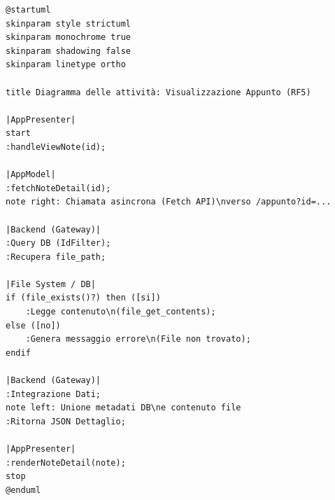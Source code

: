 \begin{verbatim}
@startuml
skinparam style strictuml
skinparam monochrome true
skinparam shadowing false
skinparam linetype ortho

title Diagramma delle attività: Visualizzazione Appunto (RF5)

|AppPresenter|
start
:handleViewNote(id);

|AppModel|
:fetchNoteDetail(id);
note right: Chiamata asincrona (Fetch API)\nverso /appunto?id=...

|Backend (Gateway)|
:Query DB (IdFilter);
:Recupera file_path;

|File System / DB|
if (file_exists()?) then ([si])
    :Legge contenuto\n(file_get_contents);
else ([no])
    :Genera messaggio errore\n(File non trovato);
endif

|Backend (Gateway)|
:Integrazione Dati;
note left: Unione metadati DB\ne contenuto file
:Ritorna JSON Dettaglio;

|AppPresenter|
:renderNoteDetail(note);
stop
@enduml
\end{verbatim}